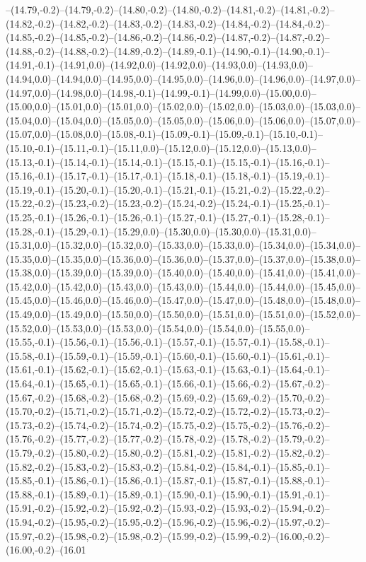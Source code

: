 --(14.79,-0.2)--(14.79,-0.2)--(14.80,-0.2)--(14.80,-0.2)--(14.81,-0.2)--(14.81,-0.2)--(14.82,-0.2)--(14.82,-0.2)--(14.83,-0.2)--(14.83,-0.2)--(14.84,-0.2)--(14.84,-0.2)--(14.85,-0.2)--(14.85,-0.2)--(14.86,-0.2)--(14.86,-0.2)--(14.87,-0.2)--(14.87,-0.2)--(14.88,-0.2)--(14.88,-0.2)--(14.89,-0.2)--(14.89,-0.1)--(14.90,-0.1)--(14.90,-0.1)--(14.91,-0.1)--(14.91,0.0)--(14.92,0.0)--(14.92,0.0)--(14.93,0.0)--(14.93,0.0)--(14.94,0.0)--(14.94,0.0)--(14.95,0.0)--(14.95,0.0)--(14.96,0.0)--(14.96,0.0)--(14.97,0.0)--(14.97,0.0)--(14.98,0.0)--(14.98,-0.1)--(14.99,-0.1)--(14.99,0.0)--(15.00,0.0)--(15.00,0.0)--(15.01,0.0)--(15.01,0.0)--(15.02,0.0)--(15.02,0.0)--(15.03,0.0)--(15.03,0.0)--(15.04,0.0)--(15.04,0.0)--(15.05,0.0)--(15.05,0.0)--(15.06,0.0)--(15.06,0.0)--(15.07,0.0)--(15.07,0.0)--(15.08,0.0)--(15.08,-0.1)--(15.09,-0.1)--(15.09,-0.1)--(15.10,-0.1)--(15.10,-0.1)--(15.11,-0.1)--(15.11,0.0)--(15.12,0.0)--(15.12,0.0)--(15.13,0.0)--(15.13,-0.1)--(15.14,-0.1)--(15.14,-0.1)--(15.15,-0.1)--(15.15,-0.1)--(15.16,-0.1)--(15.16,-0.1)--(15.17,-0.1)--(15.17,-0.1)--(15.18,-0.1)--(15.18,-0.1)--(15.19,-0.1)--(15.19,-0.1)--(15.20,-0.1)--(15.20,-0.1)--(15.21,-0.1)--(15.21,-0.2)--(15.22,-0.2)--(15.22,-0.2)--(15.23,-0.2)--(15.23,-0.2)--(15.24,-0.2)--(15.24,-0.1)--(15.25,-0.1)--(15.25,-0.1)--(15.26,-0.1)--(15.26,-0.1)--(15.27,-0.1)--(15.27,-0.1)--(15.28,-0.1)--(15.28,-0.1)--(15.29,-0.1)--(15.29,0.0)--(15.30,0.0)--(15.30,0.0)--(15.31,0.0)--(15.31,0.0)--(15.32,0.0)--(15.32,0.0)--(15.33,0.0)--(15.33,0.0)--(15.34,0.0)--(15.34,0.0)--(15.35,0.0)--(15.35,0.0)--(15.36,0.0)--(15.36,0.0)--(15.37,0.0)--(15.37,0.0)--(15.38,0.0)--(15.38,0.0)--(15.39,0.0)--(15.39,0.0)--(15.40,0.0)--(15.40,0.0)--(15.41,0.0)--(15.41,0.0)--(15.42,0.0)--(15.42,0.0)--(15.43,0.0)--(15.43,0.0)--(15.44,0.0)--(15.44,0.0)--(15.45,0.0)--(15.45,0.0)--(15.46,0.0)--(15.46,0.0)--(15.47,0.0)--(15.47,0.0)--(15.48,0.0)--(15.48,0.0)--(15.49,0.0)--(15.49,0.0)--(15.50,0.0)--(15.50,0.0)--(15.51,0.0)--(15.51,0.0)--(15.52,0.0)--(15.52,0.0)--(15.53,0.0)--(15.53,0.0)--(15.54,0.0)--(15.54,0.0)--(15.55,0.0)--(15.55,-0.1)--(15.56,-0.1)--(15.56,-0.1)--(15.57,-0.1)--(15.57,-0.1)--(15.58,-0.1)--(15.58,-0.1)--(15.59,-0.1)--(15.59,-0.1)--(15.60,-0.1)--(15.60,-0.1)--(15.61,-0.1)--(15.61,-0.1)--(15.62,-0.1)--(15.62,-0.1)--(15.63,-0.1)--(15.63,-0.1)--(15.64,-0.1)--(15.64,-0.1)--(15.65,-0.1)--(15.65,-0.1)--(15.66,-0.1)--(15.66,-0.2)--(15.67,-0.2)--(15.67,-0.2)--(15.68,-0.2)--(15.68,-0.2)--(15.69,-0.2)--(15.69,-0.2)--(15.70,-0.2)--(15.70,-0.2)--(15.71,-0.2)--(15.71,-0.2)--(15.72,-0.2)--(15.72,-0.2)--(15.73,-0.2)--(15.73,-0.2)--(15.74,-0.2)--(15.74,-0.2)--(15.75,-0.2)--(15.75,-0.2)--(15.76,-0.2)--(15.76,-0.2)--(15.77,-0.2)--(15.77,-0.2)--(15.78,-0.2)--(15.78,-0.2)--(15.79,-0.2)--(15.79,-0.2)--(15.80,-0.2)--(15.80,-0.2)--(15.81,-0.2)--(15.81,-0.2)--(15.82,-0.2)--(15.82,-0.2)--(15.83,-0.2)--(15.83,-0.2)--(15.84,-0.2)--(15.84,-0.1)--(15.85,-0.1)--(15.85,-0.1)--(15.86,-0.1)--(15.86,-0.1)--(15.87,-0.1)--(15.87,-0.1)--(15.88,-0.1)--(15.88,-0.1)--(15.89,-0.1)--(15.89,-0.1)--(15.90,-0.1)--(15.90,-0.1)--(15.91,-0.1)--(15.91,-0.2)--(15.92,-0.2)--(15.92,-0.2)--(15.93,-0.2)--(15.93,-0.2)--(15.94,-0.2)--(15.94,-0.2)--(15.95,-0.2)--(15.95,-0.2)--(15.96,-0.2)--(15.96,-0.2)--(15.97,-0.2)--(15.97,-0.2)--(15.98,-0.2)--(15.98,-0.2)--(15.99,-0.2)--(15.99,-0.2)--(16.00,-0.2)--(16.00,-0.2)--(16.01